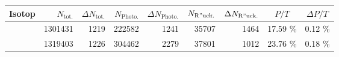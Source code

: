 \begin{tabular}{lrrrrrrSS}
\toprule
{Isotop} & {$N_\mathrm{tot.}$} & {$\Delta N_\mathrm{tot.}$} & {$N_\mathrm{Photo.}$} & {$\Delta N_\mathrm{Photo.}$} & {$N_\mathrm{R"uck.}$} & {$\Delta N_\mathrm{R"uck.}$} & {$P/T$}   & {$\Delta P/T$} \\
\midrule
{} & 1301431    & 1219   & 222582    & 1241   & 35707         & 1464   & 17.59 \% & 0.12 \% \\
 & 1319403    & 1226   & 304462    & 2279   & 37801         & 1012   & 23.76 \% & 0.18 \% \\
\bottomrule
\end{tabular}